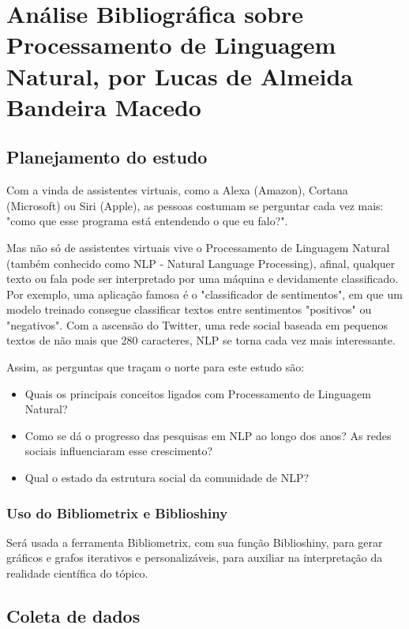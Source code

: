 \chapter{Análise Bibliográfica sobre Processamento de Linguagem Natural, por Lucas de Almeida Bandeira Macedo}

\section{Planejamento do estudo}

Com a vinda de assistentes virtuais, como a Alexa (Amazon), Cortana (Microsoft) ou Siri (Apple), as pessoas costumam se perguntar cada vez mais: "como que esse programa está entendendo o que eu falo?".

Mas não só de assistentes virtuais vive o Processamento de Linguagem Natural (também conhecido como NLP - Natural Language Processing), afinal, qualquer texto ou fala pode ser interpretado por uma máquina e devidamente classificado. Por exemplo, uma aplicação famosa é o "classificador de sentimentos", em que um modelo treinado consegue classificar textos entre sentimentos "positivos" ou "negativos". Com a ascensão do Twitter, uma rede social baseada em pequenos textos de não mais que 280 caracteres, NLP se torna cada vez mais interessante.

Assim, as perguntas que traçam o norte para este estudo são:

\begin{itemize}
    \item Quais os principais conceitos ligados com Processamento de Linguagem Natural?
    \item Como se dá o progresso das pesquisas em NLP ao longo dos anos? As redes sociais influenciaram esse crescimento?
    \item Qual o estado da estrutura social da comunidade de NLP?
\end{itemize}

\subsection{Uso do Bibliometrix e Biblioshiny}

Será usada a ferramenta Bibliometrix, com sua função Biblioshiny, para gerar gráficos e grafos iterativos e personalizáveis, para auxiliar na interpretação da realidade científica do tópico.

\section{Coleta de dados}

